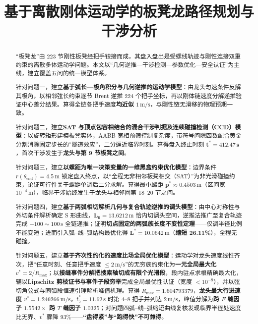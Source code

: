 ﻿\documentclass{cumcmthesis}
\title{基于离散刚体运动学的板凳龙路径规划与干涉分析}
\begin{document}
\maketitle

\begin{abstract}
“板凳龙”由 $223$ 节刚性板凳经把手铰接而成，其盘入盘出是受螺线轨迹与刚性连接双重约束的离散多体运动学问题。本文以“几何逆推—干涉检测—参数优化—安全认证”为主线，建立覆盖五问的统一模型体系。

针对问题一，建立\textbf{基于弧长—极角积分与几何逆推的运动学模型}：由龙头匀速条件反解其极角，以相邻弦长约束逐节 Brent 逆推 224 个把手坐标，再以刚体链速度分解递推验证中心差分结果。算得全链各把手速度\textbf{均近似 $1\,\mathrm{m/s}$}，与刚性链无滑移的物理预期一致。

针对问题二，建立\textbf{SAT 与顶点包容相结合的混合干涉判据及连续碰撞检测（CCD）模型}：以旋转矩形建模板凳实体，AABB 宽相预筛控制复杂度，带符号间隙函数配合黄金分割消除固定步长的“隧道效应”，二分逼近临界时刻。算得盘入终止时刻 $\boldsymbol{t^{*}=412.47\,\text{s}}$，首次干涉发生于\textbf{龙头与第 9 节板凳之间}。

针对问题三，建立\textbf{以螺距为唯一决策变量的一维黑盒约束优化模型}：边界条件 $r(\theta_{\mathrm{end}})=4.5\,\mathrm{m}$ 锁定盘入终点，以“全程无非相邻板凳相交（SAT）”为非光滑碰撞约束，论证可行性关于螺距单调后二分求解。算得最小螺距 $\boldsymbol{p^{*}\approx 0.4503\,\mathrm{m}}$（区间宽 $10^{-4}\,\mathrm{m}$），临界干涉始终发生于龙头与相邻圈第 18~20 节之间。

针对问题四，建立\textbf{基于两弧相切解析几何与复合轨迹逆推的调头模型}：由中心对称性与外切条件解析确定 S 形曲线，$\boldsymbol{L_0=13.6212\,\mathrm{m}}$ 恰内切调头空间，逆推法推广至复合轨迹完成 $-100\sim100\,\text{s}$ 全链递推；证明\textbf{切点固定的两弧族长度不变性定理}——仅调半径比例不能变短；进而引入弧–线–弧结构最优化得 $\boldsymbol{L^{*}=10.0642\,\mathrm{m}}$（\textbf{缩短 26.11\%}），全程无碰撞。

针对问题五，建立\textbf{基于齐次性约化的速度比场全局优化模型}：运动学对龙头速度线性齐次，把“任意时刻、任意把手速度 $\le 2\,\text{m/s}$”的无穷族约束化为\textbf{一元全局最大化} $v^{*}=2/R_{\max}$；以\textbf{接缝事件分解把搜索轴切成有限个光滑段}，段内驻点求根精确最大化，辅以\textbf{Lipschitz 剪枝证书与事件子段穷举}完成全局最优性认证（宽度 $<10^{-9}$），并以弦切角公式与同弧段恒速引理解析峰值机理。算得 $R_{\max}=1.604793379$，\textbf{龙头最大行进速度 $v^{*}=1.246266\,\text{m/s}$}，$t^{*}_{5}=11.62\,\text{s}$ 时第 4--8 把手并列达 $2\,\text{m/s}$，峰值分解为\textbf{跨 $F$ 缝因子 $1.5542\times$ 跨 $T$ 缝因子 $1.0325$}；对问题四弧–线–弧缩短曲线复核发现临界半径处速度比无界、$v^{*}$ 骤降 $93\%$——\textbf{“盘得紧”与“跑得快”不可兼得}。

\end{abstract}
\end{document}
